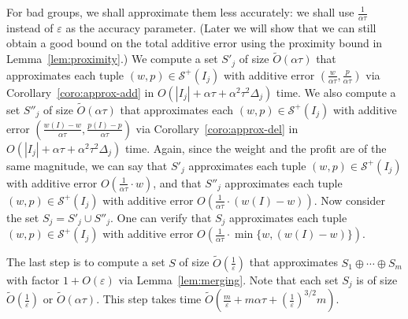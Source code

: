 \documentclass[a4paper,UKenglish,cleveref, autoref, thm-restate, pdfa]{lipics-v2021}
\newcommand{\eps}{\varepsilon}
\begin{document}
For bad groups, we shall approximate them less accurately: we shall use $\frac{1}{\alpha\tau}$ instead of $\eps$ as the accuracy parameter. (Later we will show that we can still obtain a good bound on the total additive error using the proximity bound in Lemma~\ref{lem:proximity}.)  We compute a set $S'_j$ of size $\tilde{O}(\alpha\tau)$ that approximates each tuple $(w, p) \in \mathcal{S}^+(I_j)$ with additive error $(\frac{w}{\alpha \tau}, \frac{p}{\alpha \tau})$ via Corollary~\ref{coro:approx-add} in $O(|I_j| + \alpha\tau + \alpha^2\tau^2\Delta_j)$ time. We also compute a set $S''_j$ of size $\tilde{O}(\alpha\tau)$ that approximates each $(w, p) \in \mathcal{S}^+(I_j)$ with additive error $(\frac{w(I)-w}{\alpha \tau}, \frac{p(I) - p}{\alpha \tau})$ via Corollary~\ref{coro:approx-del} in $O(|I_j| + \alpha\tau + \alpha^2\tau^2\Delta_j)$ time. Again, since the weight and the profit are of the same magnitude, we can say that $S'_j$ approximates each tuple $(w, p) \in \mathcal{S}^+(I_j)$ with additive error $O(\frac{1}{\alpha \tau}\cdot w)$, and that $S''_j$ approximates each tuple $(w, p) \in \mathcal{S}^+(I_j)$ with additive error $O(\frac{1}{\alpha \tau}\cdot(w(I) - w))$. Now consider the set $S_j = S'_j \cup S''_j$. One can verify that $S_j$ approximates each tuple $(w, p) \in \mathcal{S}^+(I_j)$ with additive error $O(\frac{1}{\alpha \tau}\cdot \min\{w, (w(I) - w)\})$.

The last step is to compute a set $S$ of size $\tilde{O}(\frac{1}{\eps})$ that approximates $S_1 \oplus \cdots \oplus S_m$ with factor $1+O(\eps)$ via Lemma~\ref{lem:merging}. Note that each set $S_j$ is of size $\tilde{O}(\frac{1}{\eps})$ or $\tilde{O}(\alpha\tau)$. This step takes time $\tilde{O}(\frac{m}{\eps} + m\alpha\tau + (\frac{1}{\eps})^{3/2}m)$.
\end{document}
